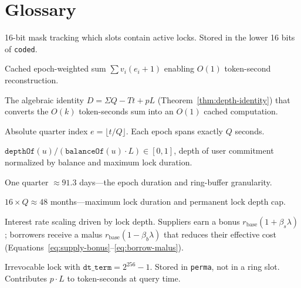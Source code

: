 \documentclass[10pt,a4paper,twocolumn]{article}
\theoremstyle{definition}
\theoremstyle{plain}
\theoremstyle{remark}
\begin{document}
\section*{Glossary}

\begin{description}[style=nextline, font=\normalfont\bfseries, leftmargin=1.5em]

\item[Bitmap] 16-bit mask tracking which slots contain active locks. Stored in the lower 16 bits of \texttt{coded}.

\item[Depth ($\Sigma$)] Cached epoch-weighted sum $\sum v_i(e_i{+}1)$ enabling $O(1)$ token-second reconstruction.

\item[Depth Identity] The algebraic identity $D = \Sigma Q - Tt + pL$ (Theorem~\ref{thm:depth-identity}) that converts the $O(k)$ token-seconds sum into an $O(1)$ cached computation.

\item[Epoch] Absolute quarter index $e = \lfloor t/Q \rfloor$. Each epoch spans exactly $Q$ seconds.

\item[Lock Ratio ($\lambda$)] $\texttt{depthOf}(u) / (\texttt{balanceOf}(u) \cdot L) \in [0,1]$, depth of user commitment normalized by balance and maximum lock duration.

\item[LOCK\_TERM ($Q$)] One quarter $\approx 91.3$ days---the epoch duration and ring-buffer granularity.

\item[LOCK\_TIME ($L$)] $16 \times Q \approx 48$ months---maximum lock duration and permanent lock depth cap.

\item[Lock Bonus/Malus] Interest rate scaling driven by lock depth. Suppliers earn a bonus $r_{\text{base}}(1 + \beta_s \lambda)$; borrowers receive a malus $r_{\text{base}}(1 - \beta_b \lambda)$ that reduces their effective cost (Equations~\ref{eq:supply-bonus}--\ref{eq:borrow-malus}).

\item[Permanent Lock] Irrevocable lock with $\texttt{dt\_term} = 2^{256}{-}1$. Stored in \texttt{perma}, not in a ring slot. Contributes $p \cdot L$ to token-seconds at query time.


\end{description}
\end{document}
